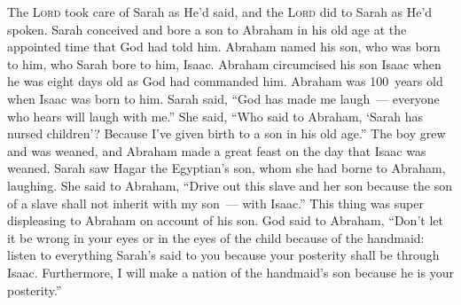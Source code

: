 
\begin{inparaenum}
   The \textsc{Lord} took care of Sarah as He'd said, and the \textsc{Lord} did to Sarah as He'd spoken.%
   Sarah conceived and bore a son to Abraham in his old age at the appointed time that God had told him.%
   Abraham named his son, who was born to him, who Sarah bore to him, Isaac.%
   Abraham circumcised his son Isaac when he was eight days old as God had commanded him.%
   Abraham was 100~years old when Isaac was born to him.%
   Sarah said, ``God has made me laugh~--- everyone who hears will laugh with me.''%
   She said, ``Who said to Abraham, `Sarah has nursed children'? Because I've given birth to a son in his old age.''%
   The boy grew and was weaned, and Abraham made a great feast on the day that Isaac was weaned.%
   Sarah saw Hagar the Egyptian's son, whom she had borne to Abraham, laughing.%
   She said to Abraham, ``Drive out this slave and her son because the son of a slave shall not inherit with my son~--- with Isaac.''%
   This\understood{} thing was super displeasing to Abraham on account of his son.%
   God said to Abraham, ``Don't let it be wrong in your eyes or in the eyes of the child because of the handmaid: listen to everything Sarah's said to you because your posterity shall be through Isaac.%
   Furthermore, I will make a nation of the handmaid's son because he is your posterity.''%

\end{inparaenum}

